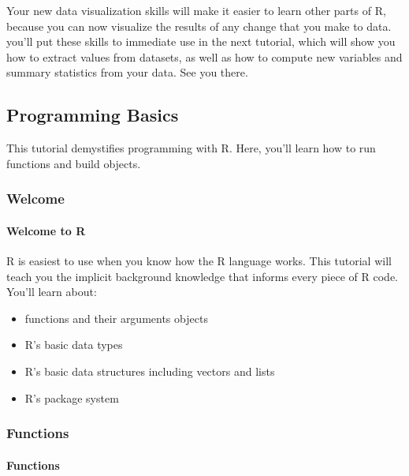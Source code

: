 \documentclass[
]{article}
\providecommand{\tightlist}{%
  \setlength{\itemsep}{0pt}\setlength{\parskip}{0pt}}
\begin{document}
Your new data visualization skills will make it easier to learn other
parts of R, because you can now visualize the results of any change that
you make to data. you'll put these skills to immediate use in the next
tutorial, which will show you how to extract values from datasets, as
well as how to compute new variables and summary statistics from your
data. See you there.

\hypertarget{programming-basics}{%
\subsection{Programming Basics}\label{programming-basics}}

This tutorial demystifies programming with R. Here, you'll learn how to
run functions and build objects.

\hypertarget{welcome-1}{%
\subsubsection{Welcome}\label{welcome-1}}

\hypertarget{welcome-to-r}{%
\paragraph{Welcome to R}\label{welcome-to-r}}

R is easiest to use when you know how the R language works. This
tutorial will teach you the implicit background knowledge that informs
every piece of R code. You'll learn about:

\begin{itemize}
\tightlist
\item
  functions and their arguments objects
\item
  R's basic data types
\item
  R's basic data structures including vectors and lists
\item
  R's package system
\end{itemize}

\hypertarget{functions}{%
\subsubsection{Functions}\label{functions}}

\hypertarget{functions-1}{%
\paragraph{Functions}\label{functions-1}}
\end{document}
